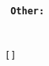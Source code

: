 \documentclass{scrartcl}
\title{}
\author{no Author}
\date{\today}
\begin{document}
\maketitle
\texttt{
\textbf{Other:} \\
\textbf{ } \\
 \\
{[}{]}
}
\end{document}
